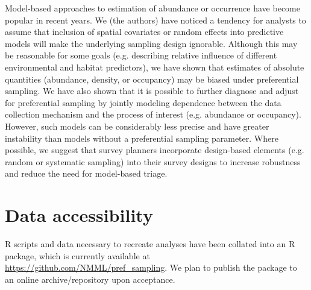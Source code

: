\documentclass[times,mee,doublespace,]{besauth2}
\begin{document}
Model-based approaches to estimation of abundance or occurrence have become popular in recent years.  We (the authors) have noticed a tendency for analysts to assume that inclusion of spatial covariates or random effects into predictive models will make the underlying sampling design ignorable. Although this may be reasonable for some goals (e.g. describing relative influence of different environmental and habitat predictors), we have shown that estimates of absolute quantities (abundance, density, or occupancy) may be biased under preferential sampling.  We have also shown that it is possible to further diagnose and adjust for preferential sampling by jointly modeling dependence between the data collection mechanism and the process of interest (e.g. abundance or occupancy).  However, such models can be considerably less precise and have greater instability than models without a preferential sampling parameter. Where possible, we suggest that survey planners incorporate design-based elements (e.g. random or systematic sampling) into their survey designs to increase robustness and reduce the need for model-based triage.



\vspace{.3in}
\section{Data accessibility}
R scripts and data necessary to recreate analyses have been collated into an R package, which is currently available at \url{https://github.com/NMML/pref_sampling}.  We plan to publish the package to an online archive/repository upon acceptance. \\




\end{document}
